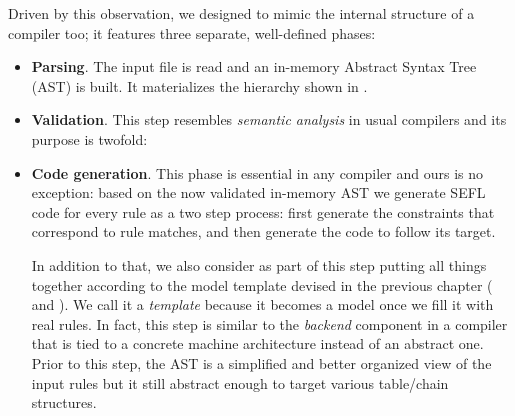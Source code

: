 Driven by this observation, we designed \TOOL to mimic the internal
structure of a compiler too; it features three separate, well-defined phases:
\begin{itemize}
  \item \textbf{Parsing}. The input file is read and an in-memory Abstract
    Syntax Tree (AST) is built.  It
    materializes the hierarchy shown in
    .
  \item \textbf{Validation}.  This step resembles \emph{semantic analysis} in
    usual compilers and its purpose is twofold:
  \item \textbf{Code generation}. This phase is essential in any compiler and
    ours is no exception: based on the now validated in-memory AST we generate
    SEFL code for every rule as a two step process: first generate the
    constraints that correspond to rule matches, and then generate the code to
    follow its target.

    In addition to that, we also consider as part of this step putting all
    things together according to the model template devised in the previous
    chapter ( and
    ).  We call it a \emph{template}
    because it becomes a model once we fill it with real rules.  In fact, this
    step is similar to the \emph{backend} component in a compiler that is tied
    to a concrete machine architecture instead of an abstract one.  Prior to
    this step, the AST is a simplified and better organized view of the input
    rules but it still abstract enough to target various table/chain
    structures.
\end{itemize}

